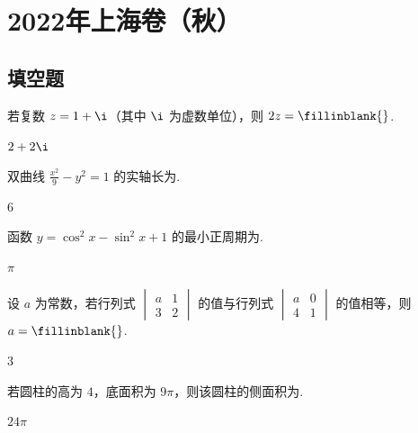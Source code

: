 \chapter{2022年上海卷（秋）}

\section{填空题}

\begin{problem}
若复数 \(z=1+\i\)（其中 \(\i\) 为虚数单位），则 \(2z=\fillinblank{}\).
\end{problem}

\begin{answer}
\(2+2\i\)
\end{answer}

\begin{problem}
双曲线 \(\frac{x^2}{9}-y^2=1\) 的实轴长为\fillinblank{}.
\end{problem}

\begin{answer}
\(6\)
\end{answer}

\begin{problem}
函数 \(y=\cos^2x-\sin^2x+1\) 的最小正周期为\fillinblank{}.
\end{problem}

\begin{answer}
\(\pi\)
\end{answer}

\begin{problem}
设 \(a\) 为常数，若行列式 \(\begin{vmatrix}a&1\\3&2\end{vmatrix}\) 的值与行列式 \(\begin{vmatrix}a&0\\4&1\end{vmatrix}\) 的值相等，则 \(a=\fillinblank{}\).
\end{problem}

\begin{answer}
\(3\)
\end{answer}

\begin{problem}
若圆柱的高为 \(4\)，底面积为 \(9\pi\)，则该圆柱的侧面积为\fillinblank{}.
\end{problem}

\begin{answer}
\(24\pi\)
\end{answer}

